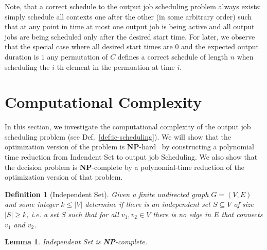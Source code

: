\documentclass{article}
\newtheorem{mydef}{Definition}
\newtheorem{mylemma}{Lemma}
\begin{document}
Note, that a correct schedule to the output job scheduling problem always exists: simply schedule all contexts one after the other (in some arbitrary order) such that at any point in time at most one output job is being active and all output jobs are being scheduled only after the desired start time. For later, we observe that the special case where all desired start times are $0$ and the expected output duration is $1$ any permutation of $C$ defines a correct schedule of length $n$ when scheduling the $i$-th element in the permuation at time $i$.

\section{Computational Complexity}
\label{sec:complexity}
In this section, we investigate the computational complexity of the output job scheduling problem (see Def.~\ref{def:ic-scheduling}). We will show that the optimization version of the problem is {\bf NP}-hard~\cite{GareyJohnson:CI:1979} by constructing a polynomial time reduction from {\sc Indendent Set} to {\sc output job Scheduling}. We also show that the decision problem is {\bf NP}-complete by a polynomial-time reduction of the optimization version of that problem.


\begin{mydef}[{\sc Independent Set}]
\label{def:independent-set}
Given a finite undirected graph $G = (V,E)$ and some integer $k \leq |V|$ determine if there is an {\em independent set} $S \subseteq V$  of size $|S| \geq k$, i.e. a set $S$ such that for all $v_1, v_2 \in V$ there is no edge in $E$ that connects $v_1$ and $v_2$.
\end{mydef}



\begin{mylemma} \label{thm:independent-set-is-np-complete}
{\sc Independent Set} %
is  {\bf NP}-complete. 
\end{mylemma}
\end{document}

